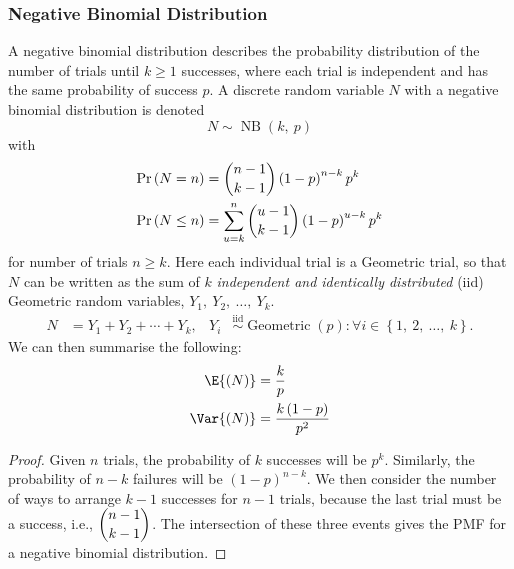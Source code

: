 \documentclass{article}
\begin{document}
\subsubsection{Negative Binomial Distribution}
A negative binomial distribution describes the probability distribution
of the number of trials until \(k \geq 1\) successes, where each trial
is independent and has the same probability of success \(p\). A
discrete random variable \(N\) with a negative binomial distribution is
denoted
\begin{equation*}
    N \sim \operatorname{NB}{\left( k,\: p \right)}
\end{equation*}
with
\begin{align*}
    \Pr{\left( N = n \right)}    & = \dbinom{n - 1}{k - 1} \left( 1 - p \right)^{n - k} p^k                \\
    \Pr{\left( N \leq n \right)} & = \sum_{u = k}^n \dbinom{u - 1}{k - 1} \left( 1 - p \right)^{u - k} p^k
\end{align*}
for number of trials \(n \geq k\). Here each individual trial is a
Geometric trial, so that \(N\) can be written as the sum of \(k\)
\textit{independent and identically distributed} (iid) Geometric random
variables, \(Y_1,\: Y_2,\: \dots,\: Y_k\).
\begin{align*}
    N & = Y_1 + Y_2 + \cdots + Y_k, & Y_i & \overset{\mathrm{iid}}{\sim} \operatorname{Geometric}{\left( p \right)} : \forall i \in \left\{ 1,\: 2,\: \dots,\: k \right\}.
\end{align*}
We can then summarise the following:
\begin{align*}
    \E{\left( N \right)}   & = \frac{k}{p}                        \\
    \Var{\left( N \right)} & = \frac{k \left( 1 - p \right)}{p^2}
\end{align*}
\begin{proof}
    Given \(n\) trials, the probability of \(k\) successes will be
    \(p^k\). Similarly, the probability of \(n - k\) failures will be
    \(\left( 1 - p \right)^{n - k}\). We then consider the number of
    ways to arrange \(k - 1\) successes for \(n - 1\) trials, because
    the last trial must be a success, i.e., \(\dbinom{n - 1}{k - 1}\).
    The intersection of these three events gives the PMF for a negative
    binomial distribution.
\end{proof}
\end{document}
